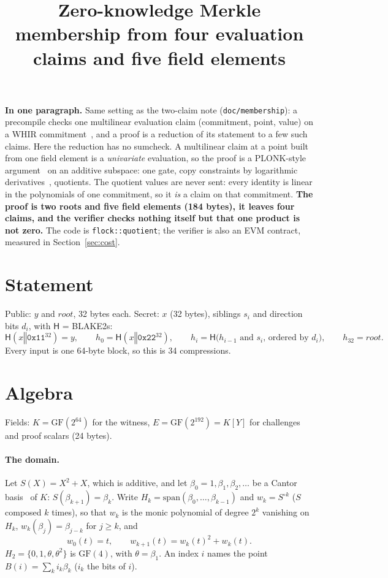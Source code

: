 \documentclass[11pt]{article}
\title{Zero-knowledge Merkle membership from four evaluation claims and five field elements}
\author{}
\date{}
\newcommand{\K}{K}
\newcommand{\E}{E}
\newcommand{\hash}{\mathsf{H}}
\newcommand{\concat}{\mathbin\Vert}
\newcommand{\rootnode}{\mathit{root}}
\newcommand{\code}[1]{\texttt{#1}}
\begin{document}
\maketitle

\noindent\textbf{In one paragraph.} Same setting as the two-claim note (\code{doc/membership}): a precompile checks one multilinear evaluation claim (commitment, point, value) on a WHIR commitment~\cite{ACFY25}, and a proof is a reduction of its statement to a few such claims. Here the reduction has no sumcheck. A multilinear claim at a point built from one field element is a \emph{univariate} evaluation, so the proof is a PLONK-style argument~\cite{Plonk} on an additive subspace: one gate, copy constraints by logarithmic derivatives~\cite{LogUp}, quotients. The quotient values are never sent: every identity is linear in the polynomials of one commitment, so it \emph{is} a claim on that commitment. \textbf{The proof is two roots and five field elements (184 bytes), it leaves four claims, and the verifier checks nothing itself but that one product is not zero.} The code is \code{flock::quotient}; the verifier is also an EVM contract, measured in Section~\ref{sec:cost}.

\section{Statement}

Public: $y$ and $\rootnode$, 32 bytes each. Secret: $x$ (32 bytes), siblings $s_i$ and direction bits $d_i$, with $\hash$ = BLAKE2s:
\[
  \hash(x \concat \mathtt{0x11}^{32}) = y, \qquad
  h_0 = \hash(x \concat \mathtt{0x22}^{32}), \qquad
  h_i = \hash\bigl(\text{$h_{i-1}$ and $s_i$, ordered by $d_i$}\bigr), \qquad
  h_{32} = \rootnode .
\]
Every input is one 64-byte block, so this is 34 compressions.

\section{Algebra}

Fields: $\K = \mathrm{GF}(2^{64})$ for the witness, $\E = \mathrm{GF}(2^{192}) = \K[Y]$ for challenges and proof scalars (24 bytes).

\paragraph{The domain.} Let $S(X) = X^2 + X$, which is additive, and let $\beta_0 = 1, \beta_1, \beta_2, \dots$ be a Cantor basis~\cite{Cantor89} of $\K$: $S(\beta_{k+1}) = \beta_k$. Write $H_k = \mathrm{span}(\beta_0, \dots, \beta_{k-1})$ and $w_k = S^{\circ k}$ ($S$ composed $k$ times), so that $w_k$ is the monic polynomial of degree $2^k$ vanishing on $H_k$, $w_k(\beta_j) = \beta_{j-k}$ for $j \ge k$, and
\[
  w_0(t) = t, \qquad w_{k+1}(t) = w_k(t)^2 + w_k(t) .
\]
$H_2 = \{0, 1, \theta, \theta^2\}$ is $\mathrm{GF}(4)$, with $\theta = \beta_1$. An index $i$ names the point $B(i) = \sum_k i_k \beta_k$ ($i_k$ the bits of $i$).
\end{document}
